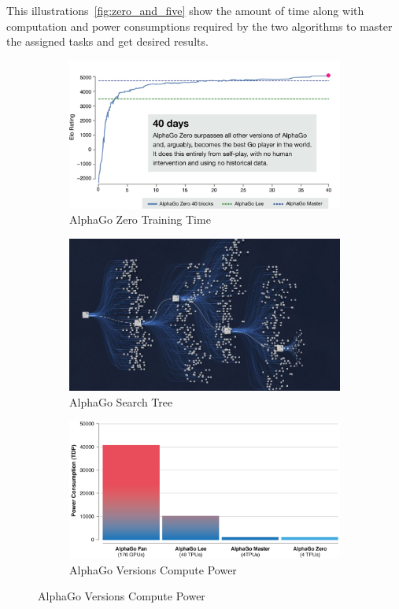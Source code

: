 This illustrations~\ref{fig:zero_and_five} show the amount of time along with computation and power consumptions required by the two algorithms to master the assigned tasks and get desired results. 

\begin{figure}[!htb]
		\centering
		\begin{subfigure}[b]{0.3\textwidth}
				\centering
				\includegraphics[width=\textwidth]{figures/rl/alphago_zero.png}
				\caption{AlphaGo Zero Training Time}
				\label{fig:alphago_train}
		\end{subfigure}
		\hfill
		\begin{subfigure}[b]{0.3\textwidth}
				\centering
				\includegraphics[width=\textwidth]{figures/rl/alphago_search_tree.png}
				\caption{AlphaGo Search Tree}
				\label{fig:alphago_search_tree}
		\end{subfigure}
		\hfill
		\begin{subfigure}[b]{0.3\textwidth}
				\centering
				\includegraphics[width=\textwidth]{figures/rl/alphago_power.png}
				\caption{AlphaGo Versions Compute Power}
				\label{fig:alphago_power}
		\end{subfigure}
		\hfill


\end{figure}
